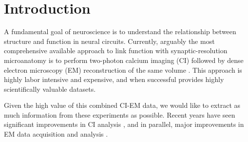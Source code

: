 \documentclass[10pt,letterpaper]{article}
\begin{document}
\linenumbers




\section{Introduction}

A fundamental goal of neuroscience is to understand the relationship between structure and function in neural circuits.  Currently, arguably the most comprehensive available approach to link function with synaptic-resolution microanatomy is to perform two-photon calcium imaging (CI) followed by dense electron microscopy (EM) reconstruction of the same volume \citep{Briggman2011,Bock2011,Lee2016,Vishwanathan2017,Hildebrand2017}.  This approach is  
highly labor intensive and expensive, and when successful provides highly scientifically valuable datasets.

Given the high value of this combined CI-EM data, we would like to extract as much information from these experiments as possible.  Recent years have seen significant improvements in CI analysis \citep{Pnevmatikakis2016, Pachitariu2016,Petersen2018, Friedrich2017a, Friedrich2017b, Zhou2018,Buchanan2018}, and in parallel, major improvements in EM data acquisition and analysis \citep{Kasthuri2015, Hayworth2015, Januszewski2018}. 

\end{document}
